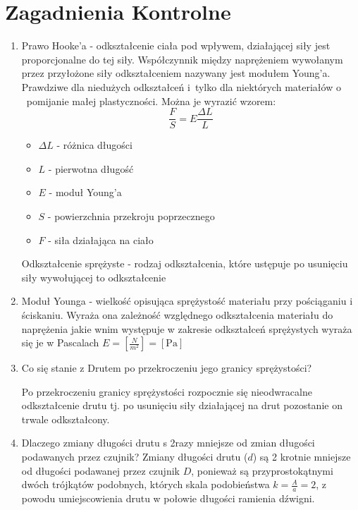 \section{Zagadnienia Kontrolne}
\begin{enumerate}
    \item \par{Prawo Hooke'a - odkształcenie ciała pod wpływem, działającej siły jest proporcjonalne do tej siły. Współczynnik między naprężeniem wywołanym przez przyłożone siły odkształceniem nazywany jest modułem Young'a. Prawdziwe dla niedużych odkształceń i~tylko dla niektórych materiałów o ~pomijanie małej plastyczności. Można je wyrazić  wzorem:
    \[\frac{F}{S}=E\frac{\Delta L}{L}\]}
    \begin{itemize}
        \item[ ] $\Delta L$ - różnica długości
        \item[ ]  $L$ - pierwotna długość
        \item[ ]  $E$ - moduł Young'a
        \item[ ]  $S$ - powierzchnia przekroju poprzecznego
        \item[ ]  $F$ - siła działająca na ciało
    \end{itemize}
    Odkształcenie sprężyste - rodzaj odkształcenia, które ustępuje po usunięciu siły wywołującej to odkształcenie 
    \addtocounter{enumi}{1}
    \addtocounter{enumi}{1}
    
    \item Moduł Younga - wielkość opisująca sprężystość materiału przy pościąganiu i ściskaniu. Wyraża ona zależność względnego odkształcenia materiału do naprężenia jakie wnim występuje w zakresie odkształceń sprężystych wyraża się je w Pascalach $E=\left[\frac{N}{m^2}\right]=[\text{Pa}]$ 
    
    \item Co się stanie z Drutem po przekroczeniu jego granicy sprężystości?
    
    Po przekroczeniu granicy sprężystości rozpocznie się nieodwracalne odkształcenie drutu tj. po usunięciu siły działającej na drut pozostanie on trwale odkształcony.
    
    \item Dlaczego zmiany długości drutu s 2razy mniejsze od zmian długości  podawanych przez czujnik?
    Zmiany długości drutu ($d$) są 2 krotnie mniejsze od długości podawanej przez czujnik $D$, ponieważ są przyprostokątnymi dwóch trójkątów podobnych, których skala podobieństwa $k=\frac{A}{a}=2$, z powodu umiejscowienia drutu w połowie długości ramienia dźwigni.
    

\end{enumerate}
